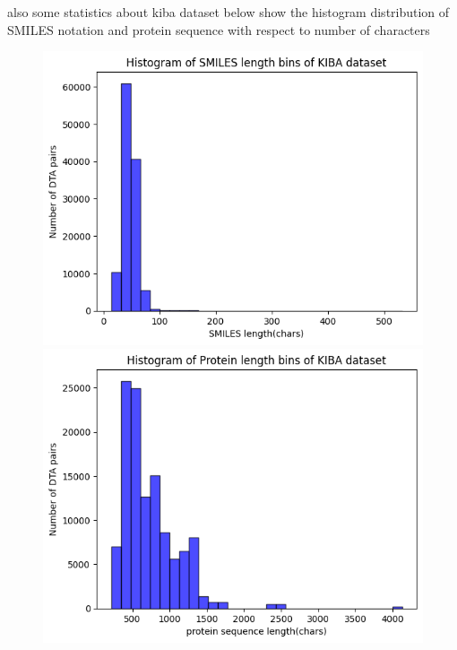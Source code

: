 \documentclass[11pt, a4paper]{article}
\begin{document}
            also some statistics about kiba dataset below show the histogram distribution of SMILES notation and protein sequence with respect to number of characters 

            \begin{figure}[H]
                \centering
                \begin{minipage}{0.45\textwidth}
                \includegraphics[width=\textwidth]{kiba/smiles histogram.png}
                \end{minipage}
                \hfill
                \begin{minipage}{0.45\textwidth}
                \includegraphics[width=\textwidth]{kiba/protein histogram.png}
                \end{minipage}
            \end{figure}
\end{document}
